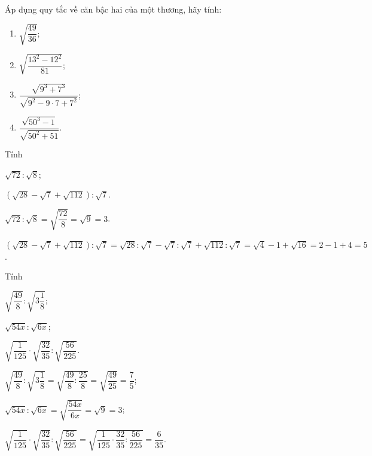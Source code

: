\begin{bt}
	Áp dụng quy tắc về căn bậc hai của một thương, hãy tính:
	\begin{multicols}{4}
	\begin{enumerate}
	\item $\sqrt{\dfrac{49}{36}}$;
	\item $\sqrt{\dfrac{13^2-12^2}{81}}$;
	\item $\dfrac{\sqrt{9^3+7^3}}{\sqrt{9^2-9 \cdot 7+7^2}}$;
	\item $\dfrac{\sqrt{50^3-1}}{\sqrt{50^2+51}}$.
	\end{enumerate}
	\end{multicols}
\end{bt}
\begin{bt}%
	Tính
	\begin{listEX}[2]
	\item$\sqrt{72}:\sqrt{8}$;
	\item $(\sqrt{28} - \sqrt{7} + \sqrt{112}) :\sqrt{7}$.
	\end{listEX}
	\loigiai
	{
	\begin{listEX}[1]
	\item$\sqrt{72}:\sqrt{8}=\sqrt{\dfrac{72}{8}}=\sqrt{9}=3$.
	\item $(\sqrt{28} - \sqrt{7} + \sqrt{112}) :\sqrt{7}=\sqrt{28}:\sqrt{7} - \sqrt{7}:\sqrt{7} + \sqrt{112}:\sqrt{7}=\sqrt{4}-1+\sqrt{16}=2-1+4=5$.
	\end{listEX}
	}
\end{bt}
\begin{bt}%
	Tính
	\begin{listEX}[3]
	\item $\sqrt{\dfrac{49}{8}}:\sqrt{3\dfrac{1}{8}}$;
	\item $\sqrt{54x}:\sqrt{6x}$;
	\item $\sqrt{\dfrac{1}{125}}\cdot\sqrt{\dfrac{32}{35}}:\sqrt{\dfrac{56}{225}}$.
	\end{listEX}
	\loigiai
	{
	\begin{listEX}[1]
	\item $\sqrt{\dfrac{49}{8}}:\sqrt{3\dfrac{1}{8}}=\sqrt{\dfrac{49}{8}:\dfrac{25}{8}}=\sqrt{\dfrac{49}{25}}=\dfrac{7}{5}$;
	\item $\sqrt{54x}:\sqrt{6x}=\sqrt{\dfrac{54x}{6x}}=\sqrt{9}=3$;
	\item $\sqrt{\dfrac{1}{125}}\cdot\sqrt{\dfrac{32}{35}}:\sqrt{\dfrac{56}{225}}
	=\sqrt{\dfrac{1}{125}\cdot\dfrac{32}{35}:\dfrac{56}{225}}
	=\dfrac{6}{35}$.	
	\end{listEX}
	}
\end{bt}
